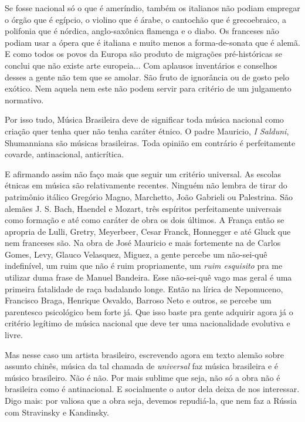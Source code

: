 Se fosse nacional só o que é ameríndio, também os italianos não podiam
empregar o órgão que é egípcio, o violino que é árabe, o cantochão que é
grecoebraico, a polifonia que é nórdica, anglo-saxônica flamenga e o
diabo. Os franceses não podiam usar a ópera que é italiana e muito menos
a forma-de-sonata que é alemã. E como todos os povos da Europa são
produto de migrações pré-históricas se conclui que não existe arte
europeia... Com aplausos inventários e conselhos desses a gente não tem
que se amolar. São fruto de ignorância ou de gosto pelo exótico. Nem
aquela nem este não podem servir para critério de um julgamento
normativo.~

Por isso tudo, Música Brasileira deve de significar toda música nacional
como criação quer tenha quer não tenha caráter étnico. O padre Mauricio,
\emph{I Salduni}, Shumanniana são músicas brasileiras. Toda opinião em
contrário é perfeitamente covarde, antinacional, anticrítica.~

E afirmando assim não faço mais que seguir um critério universal. As
escolas étnicas em música são relativamente recentes. Ninguém não lembra
de tirar do patrimônio itálico Gregório Magno, Marchetto, João Gabrieli
ou Palestrina. São alemães J. S. Bach, Haendel e Mozart, três espíritos
perfeitamente universais como formação e até como caráter de obra os
dois últimos. A França então se apropria de Lulli, Gretry, Meyerbeer,
Cesar Franck, Honnegger e até Gluck que nem franceses são. Na obra de
José Mauricio e mais fortemente na de Carlos Gomes, Levy, Glauco
Velasquez, Miguez, a gente percebe um não-sei-quê indefinível, um ruim
que não é ruim propriamente, um \emph{ruim esquisito} pra me utilizar
duma frase de Manuel Bandeira. Esse não-sei-quê vago mas geral é uma
primeira fatalidade de raça badalando longe. Então na lírica de
Nepomuceno, Francisco Braga, Henrique Osvaldo, Barroso Neto e outros, se
percebe um parentesco psicológico bem forte já. Que isso baste pra gente
adquirir agora já o critério legítimo de música nacional que deve ter
uma nacionalidade evolutiva e livre.

Mas nesse caso um artista brasileiro, escrevendo agora em texto alemão
sobre assunto chinês, música da tal chamada de \emph{universal} faz
música brasileira e é músico brasileiro. Não é não. Por mais sublime que
seja, não só a obra não é brasileira como é antinacional. E socialmente
o autor dela deixa de nos interessar. Digo mais: por valiosa que a obra
seja, devemos repudiá-la, que nem faz a Rússia com Stravinsky e
Kandinsky.

